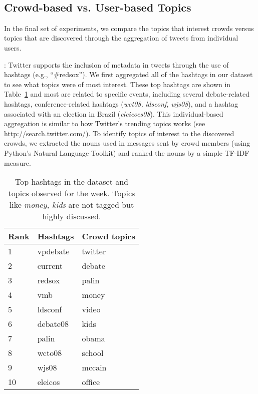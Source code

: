 \documentclass{sig-alternate}
\begin{document}



\ \\
\subsection{Crowd-based vs. User-based Topics}
In the final set of experiments, we compare the topics that interest crowds
versus topics that are discovered through the aggregation of tweets from
individual users.



\medskip{}: Twitter supports the inclusion of
metadata in tweets through the use of hashtags (e.g., ``\#redsox''). We first
aggregated all of the hashtags in our dataset to see what topics were of most
interest. These top hashtags are shown in Table~\ref{table:hashtags-topics} and
most are related to specific events, including several debate-related hashtags,
conference-related hashtags (\textit{wct08, ldsconf, wjs08}), and a hashtag
associated with an election in Brazil (\textit{eleicoes08}). This
individual-based aggregation is similar to how Twitter's trending topics works
(see http://search.twitter.com/). To identify topics of interest to the
discovered crowds, we extracted the nouns used in messages sent by crowd members
(using Python's Natural Language Toolkit) and ranked the nouns by a simple TF-IDF
measure.

\begin{table}
\centering
\begin{tabular}{|p{2cm}|p{2cm}|p{2cm}|}
\hline
\textbf{Rank} & \textbf{Hashtags} &
\textbf{Crowd topics} \\ \hline 
1 & vpdebate & twitter \\ \hline
2 & current & debate \\ \hline
3 & redsox & palin \\ \hline
4 & vmb & money \\ \hline
5 & ldsconf & video \\ \hline
6 & debate08 & kids \\ \hline
7 & palin & obama \\ \hline
8 & wcto08 & school \\ \hline
9 & wjs08 & mccain \\ \hline
10 & eleicos & office \\ \hline
\end{tabular}
\caption{Top hashtags in the dataset and topics observed for the week. Topics
like \textit{money, kids} are not tagged but highly discussed.}
\label{table:hashtags-topics}
\end{table}
\end{document}
